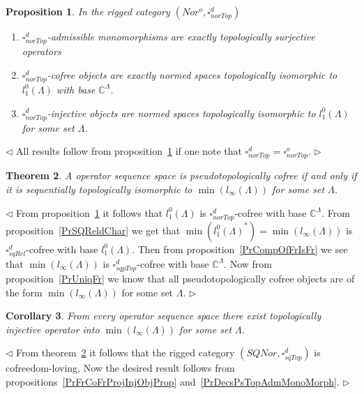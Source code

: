 \documentclass[12pt]{article}
\newtheorem{theorem}{Theorem}[subsection]
\newtheorem{proposition}[theorem]{Proposition}
\newtheorem{corollary}[theorem]{Corollary}
\newenvironment{proof}{\par $\triangleleft$}{$\triangleright$}
\begin{document}
\begin{proposition}\label{PrNorTopdChar}
In the rigged category $(Nor^o, \square_{norTop}^d)$
\begin{enumerate}[label = (\roman*)]
    \item $\square_{norTop}^d$-admissible monomorphisms are exactly 
    topologically surjective operators

    \item $\square_{norTop}^d$-cofree objects are exactly normed spaces 
    topologically isomorphic to $l_1^0(\Lambda)$ with base $\mathbb{C}^\Lambda$.

    \item $\square_{norTop}^d$-injective objects are normed spaces 
    topologically isomorphic to  $l_1^0(\Lambda)$ for some set $\Lambda$. 
\end{enumerate}
\end{proposition}
\begin{proof}
All results follow from proposition~\ref{PrNorTopdChar} if one note 
that $\square_{norTop}^d=\square_{norTop}^o$.
\end{proof}

\begin{theorem}\label{ThPsTopCoFrDesc} 
A operator sequence space is pseudotopologically cofree if and only if it 
is sequentially topologically isomorphic to $\min(l_\infty(\Lambda))$ 
for some set $\Lambda$.
\end{theorem}
\begin{proof}
From proposition~\ref{PrNorTopdChar} it follows that $l_1^0(\Lambda)$ 
is $\square_{norTop}^d$-cofree with base $\mathbb{C}^\Lambda$. 
From proposition~\ref{PrSQReldChar} we get that 
$\min({l_1^0(\Lambda)}^*)
=\min(l_\infty(\Lambda))$ is  $\square_{sqRel}^d$-cofree with base 
$l_1^0(\Lambda)$. Then from proposition~\ref{PrCompOfFrIsFr} we see 
that  $\min(l_\infty(\Lambda))$ is $\square_{sqpTop}^d$-cofree with 
base $\mathbb{C}^\Lambda$. Now from proposition~\ref{PrUniqFr} we know that 
all pseudotopologically cofree objects are of the 
form $\min(l_\infty(\Lambda))$ for some set $\Lambda$.
\end{proof}

\begin{corollary}\label{CorSQSpaceIsFromPsTopAdmMonoMorph}
From every operator sequence space there exist topologically 
injective operator into $\min(l_\infty(\Lambda))$ for some set $\Lambda$.
\end{corollary}
\begin{proof}
From theorem~\ref{ThPsTopCoFrDesc} it follows that the 
rigged category $(SQNor,\square_{sqTop}^d)$ is cofreedom-loving. Now 
the desired result  follows from propositions~\ref{PrFrCoFrProjInjObjProp} 
and~\ref{PrDecsPsTopAdmMonoMorph}.
\end{proof}
\end{document}
